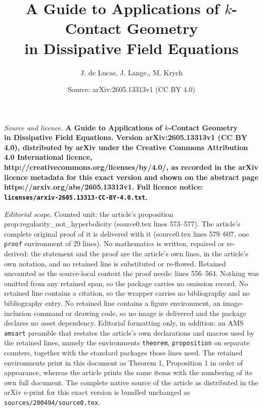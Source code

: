 \documentclass[10pt,a4paper]{amsart}
\title{\bf A Guide to Applications of $k$-Contact Geometry\\ in Dissipative Field Equations}
\author{J. de Lucas, J. Lange,, M. Krych}
\date{Source: arXiv:2605.13313v1 (CC BY 4.0)}
\begin{document}
\maketitle

\noindent\emph{Source and licence.} \bf A Guide to Applications of $k$-Contact Geometry\\ in Dissipative Field Equations. Version arXiv:2605.13313v1 (CC BY 4.0), distributed by arXiv under the Creative Commons Attribution 4.0 International licence, http://creativecommons.org/licenses/by/4.0/, as recorded in the arXiv licence metadata for this exact version and shown on the abstract page https://arxiv.org/abs/2605.13313v1. Full licence notice: \texttt{licenses/arxiv-2605.13313-CC-BY-4.0.txt}.\par\smallskip

\noindent\textit{Editorial scope.} Counted unit: the article's proposition prop:regularity\_not\_hyperbolicity (source0.tex lines 573--577). The article's complete original proof of it is delivered with it (source0.tex lines 579--607, one \texttt{proof} environment of 29 lines). No mathematics is written, repaired or re-derived: the statement and the proof are the article's own lines, in the article's own notation, and no retained line is substituted or re-flowed.  Retained uncounted as the source-local context the proof needs: lines 556--564.  Nothing was omitted from any retained span, so the package carries no omission record.  No retained line contains a citation, so the wrapper carries no bibliography and no bibliography entry.  No retained line contains a figure environment, an image-inclusion command or drawing code, so no image is delivered and the package declares no asset dependency.  Editorial formatting only, in addition: an AMS \texttt{amsart} preamble that restates the article's own declarations and macros used by the retained lines, namely the environments \texttt{theorem}, \texttt{proposition} on separate counters, together with the standard packages those lines need.  The retained environments print in this document as Theorem 1, Proposition 1 in order of appearance, whereas the article prints the same items with the numbering of its own full document.  The complete native source of the article as distributed in the arXiv e-print for this exact version is bundled unchanged as \texttt{sources/200494/source0.tex}.
\end{document}
